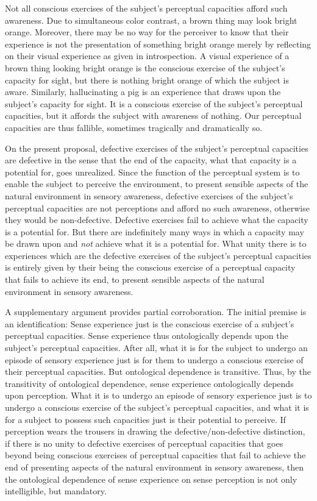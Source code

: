 \documentclass[12pt]{article}
\begin{document}
Not all conscious exercises of the subject's perceptual capacities afford such awareness. Due to simultaneous color contrast, a brown thing may look bright orange. Moreover, there may be no way for the perceiver to know that their experience is not the presentation of something bright orange merely by reflecting on their visual experience as given in introspection. A visual experience of a brown thing looking bright orange is the conscious exercise of the subject's capacity for sight, but there is nothing bright orange of which the subject is aware. Similarly, hallucinating a pig is an experience that draws upon the subject's capacity for sight. It is a conscious exercise of the subject's perceptual capacities, but it affords the subject with awareness of nothing. Our perceptual capacities are thus fallible, sometimes tragically and dramatically so. 

On the present proposal, defective exercises of the subject's perceptual capacities are defective in the sense that the end of the capacity, what that capacity is a potential for, goes unrealized. Since the function of the perceptual system is to enable the subject to perceive the environment, to present sensible aspects of the natural environment in sensory awareness, defective exercises of the subject's perceptual capacities are not perceptions and afford no such awareness, otherwise they would be non-defective. Defective exercises fail to achieve what the capacity is a potential for. But there are indefinitely many ways in which a capacity may be drawn upon and \emph{not} achieve what it is a potential for. What unity there is to experiences which are the defective exercises of the subject's perceptual capacities is entirely given by their being the conscious exercise of a perceptual capacity that fails to achieve its end, to present sensible aspects of the natural environment in sensory awareness. 

A supplementary argument provides partial corroboration. The initial pre\-mise is an identification: Sense experience just is the conscious exercise of a subject's perceptual capacities. Sense experience thus ontologically depends upon the subject's perceptual capacities. After all, what it is for the subject to undergo an episode of sensory experience just is for them to undergo a conscious exercise of their perceptual capacities. But ontological dependence is transitive. Thus, by the transitivity of ontological dependence, sense experience ontologically depends upon perception. What it is to undergo an episode of sensory experience just is to undergo a conscious exercise of the subject's perceptual capacities, and what it is for a subject to possess such capacities just is their potential to perceive. If perception wears the trousers in drawing the defective/non-defective distinction, if there is no unity to defective exercises of perceptual capacities that goes beyond being conscious exercises of perceptual capacities that fail to achieve the end of presenting aspects of the natural environment in sensory awareness, then the ontological dependence of sense experience on sense perception is not only intelligible, but mandatory.
\end{document}

